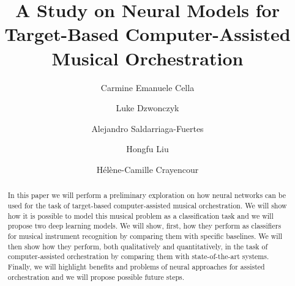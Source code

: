 \documentclass[runningheads,a4paper]{llncs}
\begin{document}
\mainmatter  %

\title{A Study on Neural Models for Target-Based Computer-Assisted Musical Orchestration}


%
%
\author{Carmine Emanuele Cella\and Luke Dzwonczyk\and Alejandro Saldarriaga-Fuertes\and Hongfu Liu\and H\'el\`ene-Camille Crayencour}
%


%
%

\maketitle

\begin{abstract}
In this paper we will perform a preliminary exploration on how neural networks can be used for the task of target-based computer-assisted musical orchestration. We will show how it is possible to model this  musical problem as a classification task and we will propose two deep learning models. We will show, first, how they perform as classifiers for musical instrument recognition by comparing them with specific baselines. We will then show how they perform, both qualitatively and quantitatively, in the task of computer-assisted orchestration by comparing them with state-of-the-art systems. Finally, we will highlight benefits and problems of neural approaches for assisted orchestration and we will propose possible future steps.
\end{abstract}
%
\end{document}
